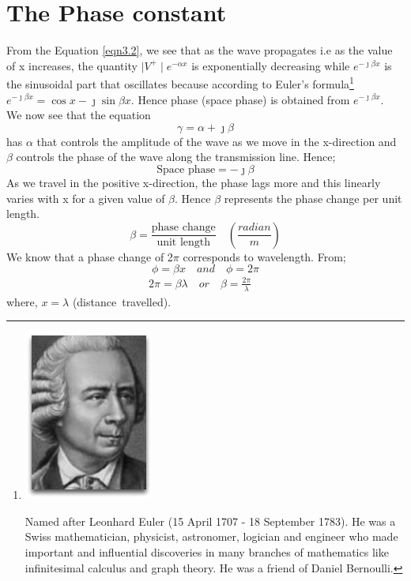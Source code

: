 \section{The Phase constant}
From the Equation \ref{eqn3.2}, we see that as the wave propagates i.e as the value of x increases, the quantity $\mid V^+\mid e^{-\alpha x}$ is exponentially decreasing while $e^{-\jmath\beta x}$ is the sinusoidal part that oscillates because according to Euler's formula\footnote{
\includegraphics[scale=0.2]{./graphics/euler}

Named after Leonhard Euler (15 April 1707 - 18 September 1783). He was a Swiss mathematician, physicist, astronomer, logician and engineer who made important and influential discoveries in many branches of mathematics like infinitesimal calculus and graph theory. He was a friend of Daniel Bernoulli.
} 
$e^{-\jmath\beta x} = \cos{x} - \jmath \sin{ \beta x}$. Hence phase (space phase) is obtained from $e^{-\jmath\beta x}$.\\

We now see that the equation 
\begin{equation}
\gamma = \alpha + \jmath\beta 
\end{equation}
has $\alpha$ that controls the amplitude of the wave as we move in the x-direction and $\beta$ controls the phase of the wave along the transmission line. Hence;
\begin{equation}
\text{Space phase} = -\jmath\beta
\end{equation}
As we travel in the positive x-direction, the phase lags more and this linearly varies with x for a given value of $\beta$. Hence $\beta$ represents the phase change per unit length.
\begin{equation}
\beta = \frac{\text{phase change}}{\text{unit length}} \quad\left(\frac{radian}{m}\right)
\end{equation}
We know that a phase change of 2$\pi$ corresponds to wavelength. From;
\begin{equation}
\phi = \beta x \quad and  \quad\phi = 2\pi
\end{equation}
\begin{align*}
2\pi = \beta\lambda \quad or \quad\beta = \frac{2\pi}{\lambda} \quad
\end{align*}
where, $ x = \lambda $ (distance\ travelled).\\

